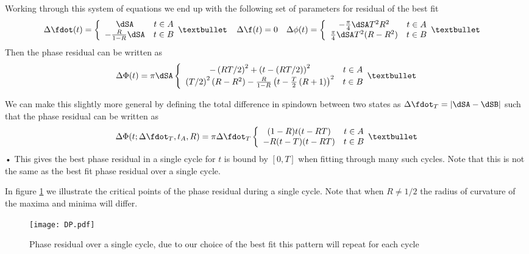 \documentclass[/home/greg/Thesis/main/main.tex]{subfiles}
\begin{document}
Working through this system of equations we end up with the following set of
parameters for residual of the best fit
\begin{align}
\Delta\fdot(t) &= \two{\dSA}{-\frac{R}{1-R}\dSA} & 
\Delta\f(t) &= 0 &
\Delta\phi(t) = \two{-\frac{\pi}{4} \dSA T^{2}R^{2}}{\frac{\pi}{4}\dSA T^{2}(R-R^{2})} &
\end{align}
Then the phase residual can be written as
\begin{equation}
\Delta\Phi(t) =\pi\dSA \two{
    -\left(RT/2\right)^{2} + \left(t-(RT/2)\right)^{2}}
    {\left(T/2\right)^{2}(R-R^{2}) - \frac{R}{1-R}\left(t-\frac{T}{2}\left(R+1\right)\right)^{2}}
\label{eqn: phase residual}
\end{equation}

We can make this slightly more general by defining the total difference in
spindown between two states as $\Delta\fdot_{T} = |\dSA - \dSB|$ such that the phase
residual can be written as
\begin{equation} 
    \Delta\Phi(t; \Delta\fdot_{T}, t_{A}, R) = \pi\Delta\fdot_{T}\two{
        (1-R)t(t-RT)
         }
        {
       -R(t-T)(t-RT)
        }
\label{eqn: full phase residual}
\end{equation}•
This gives the best phase residual in a single cycle for $t$ is bound by $[0, T]$ when fitting
through many such cycles. Note that 
this is not the same as the best fit phase residual over a single cycle. 

In figure \ref{fig: Lyne analytic illustration} we illustrate the critical points of the
phase residual during a single cycle. Note that when $R\ne1/2$ the radius of
curvature of the maxima and minima will differ.
\begin{figure}[ht]
    \centering
    \texttt{[image: DP.pdf]}
    \caption{Phase residual over a single cycle, due to our choice of the best
             fit this pattern will repeat for each cycle}
    \label{fig: Lyne analytic illustration}
\end{figure}
\end{document}
